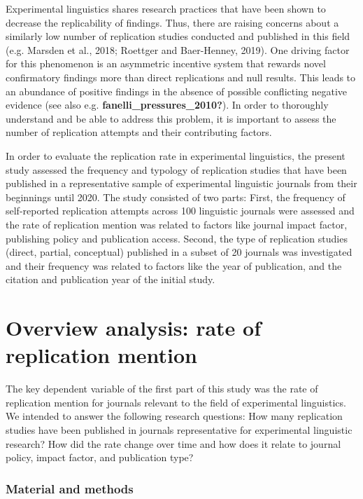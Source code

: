 \documentclass[]{elsarticle} %
\begin{document}
Experimental linguistics shares research practices that have been shown
to decrease the replicability of findings. Thus, there are raising
concerns about a similarly low number of replication studies conducted
and published in this field (e.g. Marsden et al., 2018; Roettger and
Baer-Henney, 2019). One driving factor for this phenomenon is an
asymmetric incentive system that rewards novel confirmatory findings
more than direct replications and null results. This leads to an
abundance of positive findings in the absence of possible conflicting
negative evidence (see also e.g. \textbf{fanelli\_pressures\_2010?}). In
order to thoroughly understand and be able to address this problem, it
is important to assess the number of replication attempts and their
contributing factors.

In order to evaluate the replication rate in experimental linguistics,
the present study assessed the frequency and typology of replication
studies that have been published in a representative sample of
experimental linguistic journals from their beginnings until 2020. The
study consisted of two parts: First, the frequency of self-reported
replication attempts across 100 linguistic journals were assessed and
the rate of replication mention was related to factors like journal
impact factor, publishing policy and publication access. Second, the
type of replication studies (direct, partial, conceptual) published in a
subset of 20 journals was investigated and their frequency was related
to factors like the year of publication, and the citation and
publication year of the initial study.

\hypertarget{overview-analysis-rate-of-replication-mention}{%
\section{Overview analysis: rate of replication
mention}\label{overview-analysis-rate-of-replication-mention}}

The key dependent variable of the first part of this study was the rate
of replication mention for journals relevant to the field of
experimental linguistics. We intended to answer the following research
questions: How many replication studies have been published in journals
representative for experimental linguistic research? How did the rate
change over time and how does it relate to journal policy, impact
factor, and publication type?

\hypertarget{material-and-methods}{%
\subsubsection{Material and methods}\label{material-and-methods}}
\end{document}
